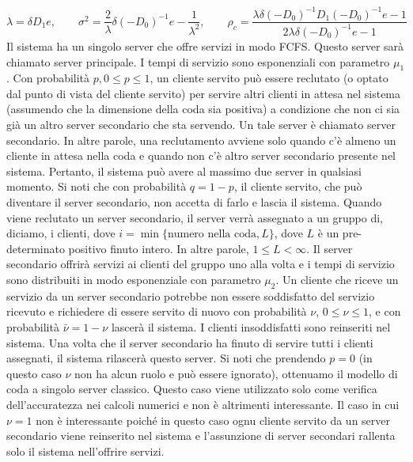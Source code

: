 \documentclass[11pt]{article}
\begin{document}
\begin{equation}
    \lambda = \delta D_1 e, \qquad \sigma^2 = \frac{2}{\lambda} \delta (-D_0)^{-1} e - \frac{1}{\lambda^2}, \qquad \rho_c = \frac{\lambda \delta (-D_0)^{-1} D_1 (-D_0)^{-1} e - 1}{2 \lambda \delta (-D_0)^{-1} e - 1}
\end{equation}
Il sistema ha un singolo server che offre servizi in modo FCFS. Questo server sarà chiamato server principale. I tempi di servizio sono esponenziali con parametro $\mu_1$. Con probabilità $p, 0 \leq p \leq 1$, un cliente servito può essere reclutato (o optato dal punto di vista del cliente servito) per servire altri clienti in attesa nel sistema (assumendo che la dimensione della coda sia positiva) a condizione che non ci sia già un altro server secondario che sta servendo. Un tale server è chiamato server secondario. In altre parole, una reclutamento avviene solo quando c'è almeno un cliente in attesa nella coda e quando non c'è altro server secondario presente nel sistema. Pertanto, il sistema può avere al massimo due server in qualsiasi momento. Si noti che con probabilità $q = 1 - p$, il cliente servito, che può diventare il server secondario, non accetta di farlo e lascia il sistema. Quando viene reclutato un server secondario, il server verrà assegnato a un gruppo di, diciamo, i clienti, dove $i = \min \{\text{numero nella coda}, L\}$, dove $L$ è un pre-determinato positivo finuto intero. In altre parole, $1 \leq L < \infty$. Il server secondario offrirà servizi ai clienti del gruppo uno alla volta e i tempi di servizio sono distribuiti in modo esponenziale con parametro $\mu_2$. Un cliente che riceve un servizio da un server secondario potrebbe non essere soddisfatto del servizio ricevuto e richiedere di essere servito di nuovo con probabilità $\nu$, $0 \leq \nu \leq 1$, e con probabilità $\bar \nu = 1 - \nu$ lascerà il sistema. I clienti insoddisfatti sono reinseriti nel sistema. Una volta che il server secondario ha finuto di servire tutti i clienti assegnati, il sistema rilascerà questo server.
Si noti che prendendo $p = 0$ (in questo caso $\nu$ non ha alcun ruolo e può essere ignorato), ottenuamo
il modello di coda a singolo server classico. Questo caso viene utilizzato solo come verifica dell'accuratezza nei calcoli numerici e non è altrimenti interessante. Il caso in cui $\nu = 1$ non è interessante poiché in questo caso ognu cliente servito da un server secondario viene reinserito nel sistema e l'assunzione di server secondari rallenta solo il sistema nell'offrire servizi.
\end{document}
